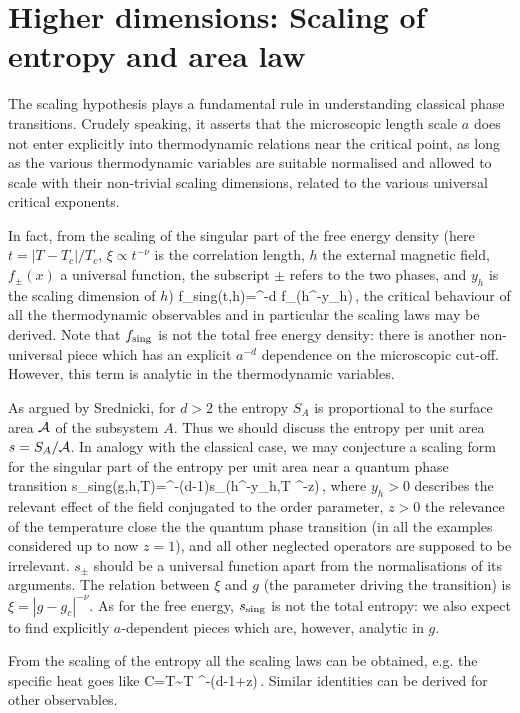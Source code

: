 \documentclass[preprint,aps]{revtex4}
\begin{document}
\section{Higher dimensions: Scaling of entropy and area law}
\label{secthd}

The scaling hypothesis plays a fundamental rule in understanding
classical phase transitions. Crudely speaking, it asserts that the
microscopic length scale $a$ does not enter explicitly into thermodynamic
relations near the critical point, as long as the various thermodynamic
variables are suitable normalised and
allowed to scale with their non-trivial scaling dimensions, related to
the various universal critical exponents.

In fact, from the scaling of the singular part of the free energy density
(here $t=|T-T_c|/T_c$, $\xi\propto t^{-\nu}$ is the correlation length,
$h$ the external magnetic field, $f_{\pm}(x)$ a universal function,
the subscript $\pm$ refers to the two phases, and $y_h$ is the scaling
dimension of $h$)
\be
f_{\rm sing}(t,h)=\xi^{-d} f_{\pm}(h\xi^{-y_h})\,,
\ee
the critical behaviour of all the thermodynamic observables and in particular
the scaling laws may be derived. Note that $f_{\rm sing}$ is not the
total free energy density: there is another non-universal piece which
has an explicit $a^{-d}$ dependence on the microscopic cut-off. However,
this term is analytic in the thermodynamic variables.

As argued by Srednicki\cite{s-93}, for $d>2$ the entropy $S_A$ is
proportional to the surface area $\cal A$ of the subsystem $A$. Thus we
should discuss the entropy per unit area $s=S_A/{\cal A}$.
In analogy with the classical case, we may conjecture a scaling
form for the singular part of the
entropy per unit area near a quantum phase transition
\be
s_{\rm sing}(g,h,T)=\xi^{-(d-1)}s_\pm(h\xi^{-y_h},T \xi^{-z})\,,
\label{Sscal}
\ee
where $y_h>0$ describes the relevant effect of the field conjugated to the
order parameter, $z>0$ the
relevance of the temperature close the the quantum phase transition (in all
the examples considered up to now $z=1$), and all
other neglected operators are supposed to be irrelevant.
$s_\pm$ should be a universal function apart from
the normalisations of its arguments.
The relation between $\xi$ and $g$ (the parameter driving the transition)
is $\xi=|g-g_c|^{-\nu}$.
As for the free energy, $s_{\rm sing}$ is not the total entropy: we also
expect to find explicitly $a$-dependent pieces which are, however,
analytic in $g$.

From the scaling of the entropy all the scaling laws
can be obtained, e.g. the specific heat goes like
\be
C=T\sim T \xi^{-(d-1+z)}\,.
\ee
Similar identities can be derived for other observables.
\end{document}
